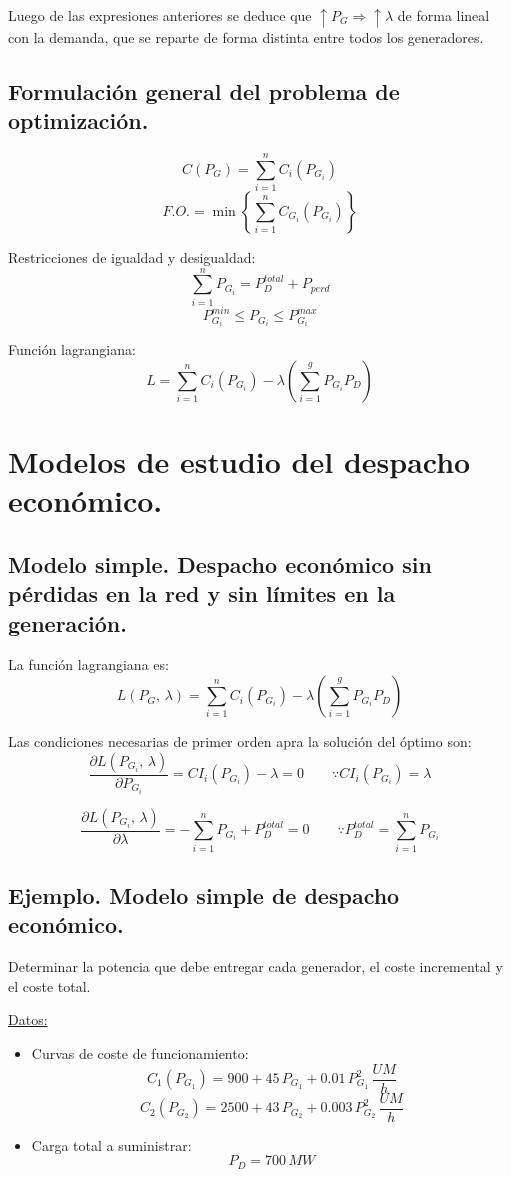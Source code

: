 				
				Luego de las expresiones anteriores se deduce que $\uparrow P_G \Rightarrow \uparrow \lambda$ de forma lineal con la demanda, que se reparte de forma distinta entre todos los generadores.
				
		\subsection{Formulación general del problema de optimización.}
			\[C(P_G) = \sum_{i=1}^n C_i(P_{G_i})\]
			\[F.O. = \min{\left\{\sum_{i=1}^n C_{G_i}(P_{G_i})\right\}}\]
				
			Restricciones de igualdad y desigualdad:
			\[\sum_{i=1}^n P_{G_i} = P_D^{total} + P_{perd}\]
			\[P_{G_i}^{min} \leq P_{G_i} \leq P_{G_i}^{max}\]
			
			Función lagrangiana:
			\[L = \sum_{i=1}^{n} C_i(P_{G_i}) - \lambda \left(\sum_{i=1}^{g} P_{G_i} P_D\right)\]

	\section{Modelos de estudio del despacho económico.}
		\subsection{Modelo simple. Despacho económico sin pérdidas en la red y sin límites en la generación.}
			La función lagrangiana es:
			\[L(P_G,\,\lambda) = \sum_{i=1}^{n} C_i(P_{G_i}) - \lambda \left(\sum_{i=1}^{g} P_{G_i} P_D\right)\]
		
			Las condiciones necesarias de primer orden apra la solución del óptimo son:
			\[\dfrac{\partial L(P_{G_i},\,\lambda)}{\partial P_{G_i}} = CI_i(P_{G_i}) - \lambda = 0 \qquad \because CI_i(P_{G_i}) = \lambda\]
			
			\[\dfrac{\partial L(P_{G_i},\,\lambda)}{\partial \lambda} = - \sum_{i=1}^{n} P_{G_i} + P_D^{total} = 0 \qquad\because P_D^{total} = \sum_{i=1}^{n} P_{G_i}\]
			
		\subsection*{Ejemplo. Modelo simple de despacho económico.}	
			Determinar la potencia que debe entregar cada generador, el coste incremental y el coste total.
			
			
			\underline{Datos:}
			\begin{itemize}
				\item Curvas de coste de funcionamiento:
				\[C_1(P_{G_1}) = 900 + 45\, P_{G_1} + 0.01\, P_{G_1}^2\,\dfrac{UM}{h}\]
				\[C_2(P_{G_2}) = 2500 + 43\, P_{G_2} + 0.003\, P_{G_2}^2\,\dfrac{UM}{h}\]
				
				\item Carga total a suministrar:
				\[P_D = 700\,MW\]
			\end{itemize}
			
